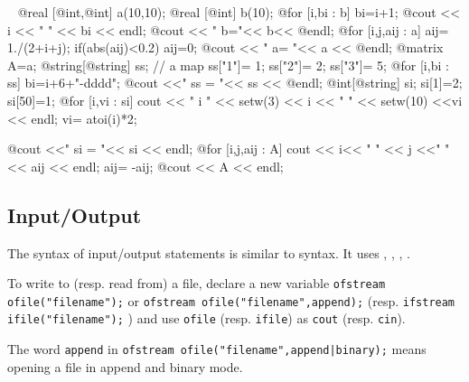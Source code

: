 \documentclass[a4paper,twoside,12pt]{book}
\def\setS#1{#1\label{sec:#1}}
\begin{document}
 \begin{example}~
\bFF
@real [@int,@int] a(10,10);
@real [@int] b(10);
@for [i,bi : b] {bi=i+1; @cout << i << " " << bi << endl;}
@cout << " b="<< b<< @endl;  
@for [i,j,aij : a] 
{
   aij= 1./(2+i+j);
   if(abs(aij)<0.2) aij=0;
}
@cout << " a= "<< a << @endl; 
@matrix A=a;
@string[@string] ss; // a map
ss["1"]= 1;
ss["2"]= 2;
ss["3"]= 5;
@for [i,bi : ss] 
    bi=i+6+"-dddd"; 
@cout <<" ss = "<< ss << @endl;
@int[@string] si;
si[1]=2;
si[50]=1;
@for [i,vi : si]
   {
   cout << " i " << setw(3) << i << " " << setw(10) <<vi << endl;
    vi= atoi(i)*2;
    }

@cout <<" si = "<< si << endl;
@for [i,j,aij : A]
{
    cout << i<< " " << j <<" " <<  aij << endl; 
    aij= -aij;
}
@cout << A << endl; 
\eFF
\end{example}



\subsection{\setS{Input/Output}}

The syntax of input/output statements is similar  to \Cpp syntax. It
uses , , , \ttCC{<<,>>}.

To write  to (resp. read from)  a file, \index{$<<$} \index{$>>$}
declare a new variable \texttt{ofstream ofile("filename");} or \texttt{ofstream ofile("filename",append);} (resp.
\texttt{ifstream ifile("filename");} ) and use \texttt{ofile}  (resp. \texttt{ifile})
as \texttt{cout} (resp. \texttt{cin}).

The word \texttt{append} in  \texttt{ofstream ofile("filename",append|binary);}
 means opening a file in append and binary mode.
\end{document}
